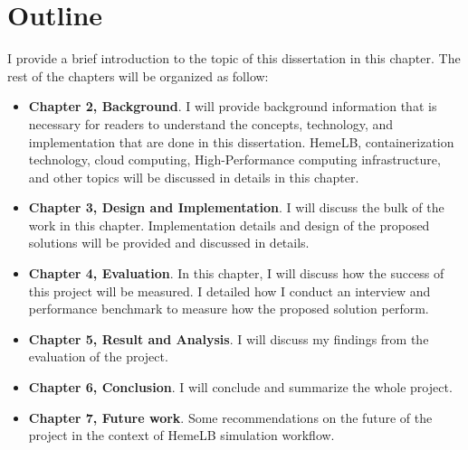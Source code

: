 \section{Outline}
I provide a brief introduction to the topic of this dissertation in this chapter. The rest of the chapters will be organized as follow:
\begin{itemize}
    \item \textbf{Chapter 2, Background}. I will provide background information that is necessary for readers to understand the concepts, technology, and implementation that are done in this dissertation. HemeLB, containerization technology, cloud computing, High-Performance computing infrastructure, and other topics will be discussed in details in this chapter.
    \item \textbf{Chapter 3, Design and Implementation}. I will discuss the bulk of the work in this chapter. Implementation details and design of the proposed solutions will be provided and discussed in details.
    \item \textbf{Chapter 4, Evaluation}. In this chapter, I will discuss how the success of this project will be measured. I detailed how I conduct an interview and performance benchmark to measure how the proposed solution perform.
    \item \textbf{Chapter 5, Result and Analysis}. I will discuss my findings from the evaluation of the project. 
    \item \textbf{Chapter 6, Conclusion}. I will conclude and summarize the whole project.
    \item \textbf{Chapter 7, Future work}. Some recommendations on the future of the project in the context of HemeLB simulation workflow.
\end{itemize}
